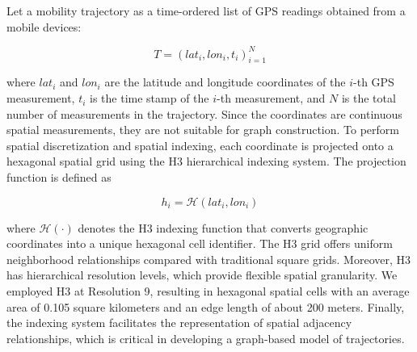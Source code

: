 \documentclass[conference]{IEEEtran}
\begin{document}




Let a mobility trajectory as a time-ordered list of GPS readings obtained from a mobile devices:

\begin{equation}
T = {(lat_i, lon_i, t_i)}_{i=1}^{N}
\end{equation}

where $lat_i$ and $lon_i$ are the latitude and longitude coordinates of the $i$-th GPS measurement, $t_i$ is the time stamp of the $i$-th measurement, and $N$ is the total number of measurements in the trajectory. Since the coordinates are continuous spatial measurements, they are not suitable for graph construction. To perform spatial discretization and spatial indexing, each coordinate is projected onto a hexagonal spatial grid using the H3 hierarchical indexing system. The projection function is defined as

\begin{equation}
h_i = \mathcal{H}(lat_i, lon_i)
\end{equation}

where $\mathcal{H}(\cdot)$ denotes the H3 indexing function that converts geographic coordinates into a unique hexagonal cell identifier. The H3 grid offers uniform neighborhood relationships compared with traditional square grids. Moreover, H3 has hierarchical resolution levels, which provide flexible spatial granularity. We employed H3 at Resolution 9, resulting in hexagonal spatial cells with an average area of 0.105 square kilometers and an edge length of about 200 meters. Finally, the indexing system facilitates the representation of spatial adjacency relationships, which is critical in developing a graph-based model of trajectories.
\end{document}

